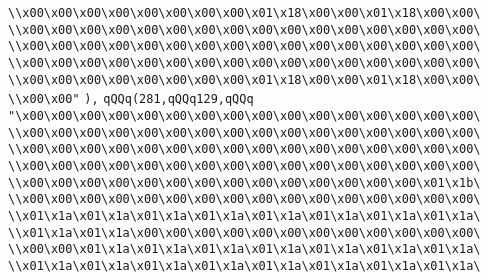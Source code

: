 \verb|\\x00\x00\x00\x00\x00\x00\x00\x00\x01\x18\x00\x00\x01\x18\x00\x00\|\newline
\verb|\\x00\x00\x00\x00\x00\x00\x00\x00\x00\x00\x00\x00\x00\x00\x00\x00\|\newline
\verb|\\x00\x00\x00\x00\x00\x00\x00\x00\x00\x00\x00\x00\x00\x00\x00\x00\|\newline
\verb|\\x00\x00\x00\x00\x00\x00\x00\x00\x00\x00\x00\x00\x00\x00\x00\x00\|\newline
\verb|\\x00\x00\x00\x00\x00\x00\x00\x00\x01\x18\x00\x00\x01\x18\x00\x00\|\newline
\verb|\\x00\x00"|\newline
\verb|),|\newline
\verb|qQQq(281,qQQq129,qQQq|\newline
\verb|"\x00\x00\x00\x00\x00\x00\x00\x00\x00\x00\x00\x00\x00\x00\x00\x00\|\newline
\verb|\\x00\x00\x00\x00\x00\x00\x00\x00\x00\x00\x00\x00\x00\x00\x00\x00\|\newline
\verb|\\x00\x00\x00\x00\x00\x00\x00\x00\x00\x00\x00\x00\x00\x00\x00\x00\|\newline
\verb|\\x00\x00\x00\x00\x00\x00\x00\x00\x00\x00\x00\x00\x00\x00\x00\x00\|\newline
\verb|\\x00\x00\x00\x00\x00\x00\x00\x00\x00\x00\x00\x00\x00\x00\x01\x1b\|\newline
\verb|\\x00\x00\x00\x00\x00\x00\x00\x00\x00\x00\x00\x00\x00\x00\x00\x00\|\newline
\verb|\\x01\x1a\x01\x1a\x01\x1a\x01\x1a\x01\x1a\x01\x1a\x01\x1a\x01\x1a\|\newline
\verb|\\x01\x1a\x01\x1a\x00\x00\x00\x00\x00\x00\x00\x00\x00\x00\x00\x00\|\newline
\verb|\\x00\x00\x01\x1a\x01\x1a\x01\x1a\x01\x1a\x01\x1a\x01\x1a\x01\x1a\|\newline
\verb|\\x01\x1a\x01\x1a\x01\x1a\x01\x1a\x01\x1a\x01\x1a\x01\x1a\x01\x1a\|\newline
